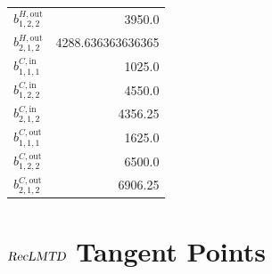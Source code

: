 \documentclass{article}%
\begin{document}
\begin{multicols*}{3}
\begin{supertabular}{lr}
	$b_{1,2,2}^{H,\text{out}}$ & 3950.0 \\%
	$b_{2,1,2}^{H,\text{out}}$ & 4288.636363636365 \\%
	$b_{1,1,1}^{C,\text{in}}$ & 1025.0 \\%
	$b_{1,2,2}^{C,\text{in}}$ & 4550.0 \\%
	$b_{2,1,2}^{C,\text{in}}$ & 4356.25 \\%
	$b_{1,1,1}^{C,\text{out}}$ & 1625.0 \\%
	$b_{1,2,2}^{C,\text{out}}$ & 6500.0 \\%
	$b_{2,1,2}^{C,\text{out}}$ & 6906.25 \\%
\end{supertabular}%
\end{multicols*}%
\clearpage%
\section{$\textsl{RecLMTD}$ Tangent Points}%
\thispagestyle{plain}%
\end{document}
